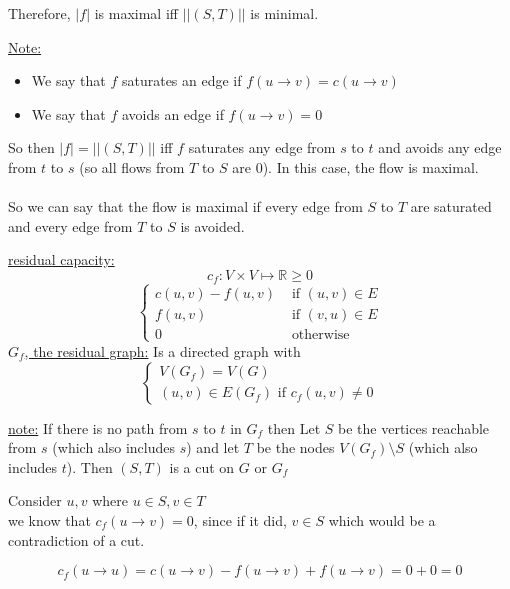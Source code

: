\documentclass[12pt]{article}
\begin{document}
Therefore, $|f|$ is maximal iff $||(S,T)||$ is minimal.

\begin{tcolorbox}
	\underline{Note:} \begin{itemize}
		\item{We say that $f$ saturates an edge if $f(u\rightarrow v) = c(u\rightarrow v)$}
		\item{We say that $f$ avoids an edge if $f(u\rightarrow v) = 0$}
	\end{itemize}

\end{tcolorbox}

So then $|f| = ||(S,T)||$ iff $f$ saturates any edge from $s$ to $t$ and avoids any edge from $t$ to $s$ (so all flows from $T$ to $S$ are 0). In this case, the flow is maximal.\\
\\
So we can say that the flow is maximal if every edge from $S$ to $T$ are saturated and every edge from $T$ to $S$ is avoided.

\begin{tcolorbox}[title=Definition: Residual Graph]
	\underline{residual capacity:} $$c_f : V \times V \mapsto \mathbb{R} \geq 0$$
	$$\begin{cases}
		c(u,v)-f(u,v) &\text{ if } (u,v) \in E\\
		f(u,v) &\text{ if } (v,u) \in E\\
		0 &\text{ otherwise}
	\end{cases}$$
	\underline{$G_f$, the residual graph:} Is a directed graph with
	$$\begin{cases}
		V(G_f) = V(G)\\
		(u,v) \in E(G_f) \text{ if } c_f(u,v) \neq 0
	\end{cases}$$
\end{tcolorbox}

\begin{tcolorbox}
	\underline{note:} If there is no path from $s$ to $t$ in $G_f$ then Let $S$ be the vertices reachable from $s$ (which also includes $s$) and let $T$ be the nodes $V(G_f) \setminus S$ (which also includes $t$). Then $(S,T)$ is a cut on $G$ or $G_f$
\end{tcolorbox}

Consider $u,v$ where $u\in S, v\in T$\\
we know that $c_f(u\rightarrow v) = 0$, since if it did, $v\in S$ which would be a contradiction of a cut.

$$c_f(u\rightarrow u) = c(u\rightarrow v) - f(u\rightarrow v) + f(u\rightarrow v) = 0 + 0 = 0$$
\end{document}

